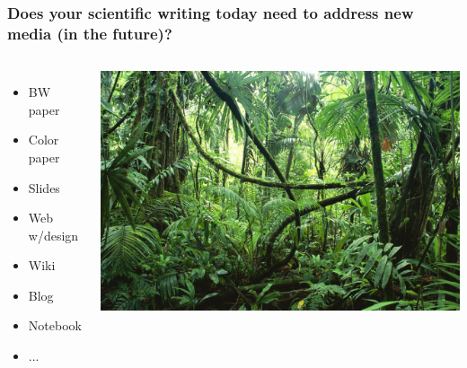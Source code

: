 \documentclass{beamer}
\begin{document}
\begin{frame}
\frametitle{Does your scientific writing today need to address new media (in the future)?}


\begin{columns}
\begin{itemize}
 \item BW paper

 \item Color paper

 \item Slides

 \item Web w/design

 \item Wiki

 \item Blog

 \item Notebook

 \item ...
\end{itemize}

\noindent

\begin{center}  %
  \centerline{\includegraphics[width=0.9\linewidth]{fig/jungle_with_mess.jpg}}
\end{center}


\end{columns}
\end{frame}
\end{document}
